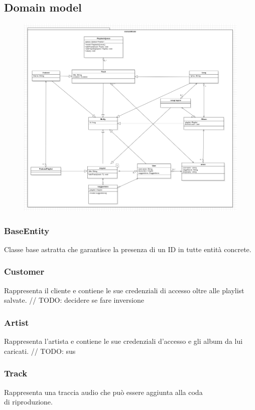\documentclass{article}
\begin{document}
  \subsection{Domain model}

  \begin{figure}[H]
    \includegraphics[scale=0.4]{model01}
  \end{figure}

  \subsubsection{BaseEntity}
  Classe base astratta che garantisce la presenza di un ID in tutte entità concrete.
  \subsubsection{Customer}
  Rappresenta il cliente e contiene le sue credenziali di accesso oltre alle playlist salvate. // TODO: decidere se fare inversione
  \subsubsection{Artist}
  Rappresenta l'artista e contiene le sue credenziali d'accesso e gli album da lui caricati. // TODO: sus
  \subsubsection{Track}
  Rappresenta una traccia audio che può essere aggiunta alla coda\\ di riproduzione.
\end{document}
